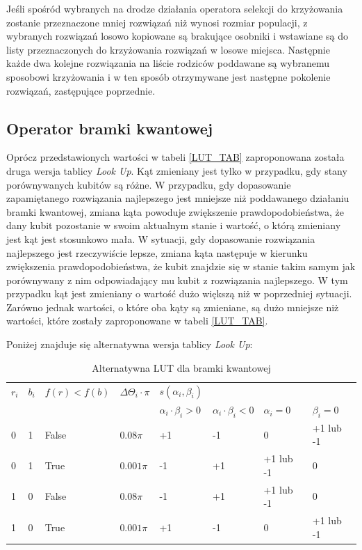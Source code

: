 Jeśli spośród wybranych na drodze działania operatora selekcji do krzyżowania zostanie przeznaczone mniej rozwiązań niż wynosi rozmiar populacji, z wybranych rozwiązań losowo kopiowane są brakujące osobniki i wstawiane są do listy przeznaczonych do krzyżowania rozwiązań w losowe miejsca. Następnie każde dwa kolejne rozwiązania na liście rodziców poddawane są wybranemu sposobowi krzyżowania i w ten sposób otrzymywane jest następne pokolenie rozwiązań, zastępujące poprzednie.

\subsection{Operator bramki kwantowej}
Oprócz przedstawionych wartości w tabeli \ref{LUT_TAB} zaproponowana została druga wersja tablicy \textit{Look Up}. Kąt zmieniany jest tylko w przypadku, gdy stany porównywanych kubitów są różne. W przypadku, gdy dopasowanie zapamiętanego rozwiązania najlepszego jest mniejsze niż poddawanego działaniu bramki kwantowej, zmiana kąta powoduje zwiększenie prawdopodobieństwa, że dany kubit pozostanie w swoim aktualnym stanie i wartość, o którą zmieniany jest kąt jest stosunkowo mała. W sytuacji, gdy dopasowanie rozwiązania najlepszego jest rzeczywiście lepsze, zmiana kąta następuje w kierunku zwiększenia prawdopodobieństwa, że kubit znajdzie się w stanie takim samym jak porównywany z nim odpowiadający mu kubit z rozwiązania najlepszego. W tym przypadku kąt jest zmieniany o wartość dużo większą niż w poprzedniej sytuacji. Zarówno jednak wartości, o które oba kąty są zmieniane, są dużo mniejsze niż wartości, które zostały zaproponowane w tabeli \ref{LUT_TAB}.

Poniżej znajduje się alternatywna wersja tablicy \textit{Look Up}:
\begin{table}[h]
\label{LUT_TAB_MOD}
\begin{tabular}{l l l l l l l l}
\hline
$r_i$ & $b_i$ & $f(r)<f(b)$ & $\Delta\Theta_i \cdot \pi$ & $s(\alpha_i,\beta_i)$ & & & \\
\cline{5-8} 
& & & & $\alpha_i \cdot \beta_i > 0$ & $\alpha_i \cdot \beta_i < 0$ & $\alpha_i = 0$ & $\beta_i = 0$ \\
\hline
0 & 1 & False & $0.08\pi$  & +1 & -1 & 0         & +1 lub -1\\
0 & 1 & True  & $0.001\pi$ & -1 & +1 & +1 lub -1 & 0\\
1 & 0 & False & $0.08\pi$  & -1 & +1 & +1 lub -1 & 0\\
1 & 0 & True  & $0.001\pi$ & +1 & -1 & 0         & +1 lub -1\\
\hline
\end{tabular}
\caption{Alternatywna LUT dla bramki kwantowej}
\end{table} 

